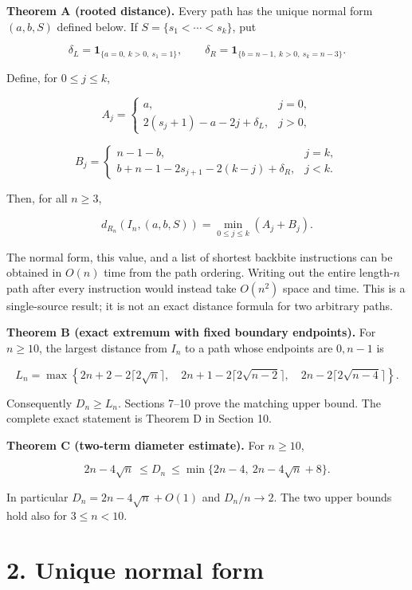 \documentclass[11pt,a4paper]{article}
\begin{document}
\textbf{Theorem A (rooted distance).} Every path has the unique normal form \((a,b,S)\) defined below. If \(S=\{s_1<\cdots<s_k\}\), put

\[\delta_L=\mathbf1_{\{a=0,\ k>0,\ s_1=1\}},\qquad
\delta_R=\mathbf1_{\{b=n-1,\ k>0,\ s_k=n-3\}}.\]

Define, for \(0\le j\le k\),

\[ A_j=\begin{cases}a,&j=0,\\
2(s_j+1)-a-2j+\delta_L,&j>0,\end{cases} \]

\[ B_j=\begin{cases}n-1-b,&j=k,\\
b+n-1-2s_{j+1}-2(k-j)+\delta_R,&j<k.\end{cases} \]

Then, for all \(n\ge3\),

\[\boxed{d_{R_n}(I_n,(a,b,S))=\min_{0\le j\le k}(A_j+B_j).}\]

The normal form, this value, and a list of shortest backbite instructions can be obtained in \(O(n)\) time from the path ordering. Writing out the entire length-\(n\) path after every instruction would instead take \(O(n^2)\) space and time. This is a single-source result; it is not an exact distance formula for two arbitrary paths.

\textbf{Theorem B (exact extremum with fixed boundary endpoints).} For \(n\ge10\), the largest distance from \(I_n\) to a path whose endpoints are \(0,n-1\) is

\[\boxed{L_n=\max\left\{
2n+2-2\lceil2\sqrt n\rceil,\quad
2n+1-2\lceil2\sqrt{n-2}\rceil,\quad
2n-2\lceil2\sqrt{n-4}\rceil\right\}.}\]

Consequently \(D_n\ge L_n\). Sections 7--10 prove the matching upper bound. The complete exact statement is Theorem D in Section 10.

\textbf{Theorem C (two-term diameter estimate).} For \(n\ge10\),

\[\boxed{2n-4\sqrt n\ \le D_n\ \le
\min\{2n-4,\ 2n-4\sqrt n+8\}.}\]

In particular \(D_n=2n-4\sqrt n+O(1)\) and \(D_n/n\longrightarrow2\). The two upper bounds hold also for \(3\le n<10\).

\hypertarget{unique-normal-form}{%
\section{2. Unique normal form}\label{unique-normal-form}}
\end{document}
